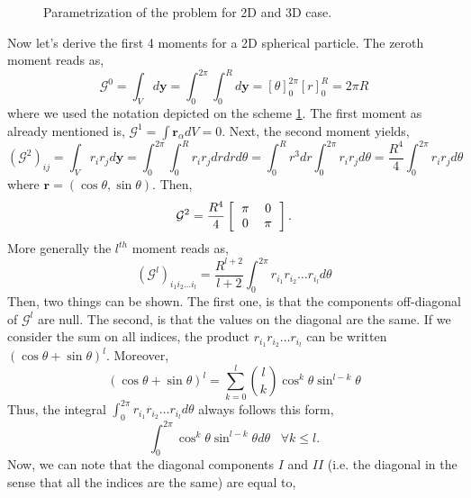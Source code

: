 {\begin{figure}[h!]
    \caption{Parametrization of the problem for 2D and 3D case.}
    \label{fig:schemeshpere}
\end{figure}
Now let's derive the first 4 moments for a 2D spherical particle. 
The zeroth moment reads as,
\begin{equation}
    \mathcal{G}^0 
    = \int_V  d\bm{y} 
    = \int_0^{2\pi}\int_0^{R}  d\bm{y} 
    = [\theta]_0^{2\pi}[r]_0^{R} 
    = 2\pi R
\end{equation}
where we used the notation depicted on the scheme \ref{fig:schemeshpere}.
The first moment as already mentioned is, $\mathcal{G}^1 = \int \bm{r}_\alpha dV = 0$.
Next, the second moment yields,
\begin{equation}
    (\mathcal{G}^2)_{ij}
    = \int_V r_ir_j d\bm{y} 
    = \int_0^{2\pi}\int_0^{R} r_ir_j d r dr d\theta 
    = \int_0^{R} r^3 dr \int_0^{2\pi} r_ir_j d\theta  
    = \frac{R^4}{4} \int_0^{2\pi} r_ir_j d\theta 
\end{equation}
where $\bm{r} = (\cos{\theta}, \sin{\theta})$. 
Then, 
\begin{equation}
    \mathcal{G}^2 = \frac{R^4}{4}\left[\begin{tabular}{cc}
        $\pi$&$0$\\
        $0$&$\pi$\\
    \end{tabular}
    \right].
\end{equation}
More generally the $l^{th}$ moment reads as, 
\begin{equation}
    (\mathcal{G}^l)_{i_1i_2\ldots i_l}
    = \frac{R^{l+2}}{l+2} \int_0^{2\pi} r_{i_1}r_{i_2}\ldots r_{i_l} d\theta 
\end{equation}
Then, two things can be shown. 
The first one, is that the components off-diagonal of $\mathcal{G}^l$ are null. 
The second, is that the values on the diagonal are the same. 
If we consider the sum on all indices, the product $r_{i_1}r_{i_2}\ldots r_{i_l}$ can be written $(\cos\theta+\sin\theta)^l$.
Moreover, 
\begin{equation}
    (\cos\theta+\sin\theta)^l  = \sum_{k=0}^l\binom{l}{k}\cos^k\theta\sin^{l-k}\theta
\end{equation}
Thus, the integral $\int_0^{2\pi} r_{i_1}r_{i_2}\ldots r_{i_l} d\theta$ always follows this form,
\begin{equation}
    \int_0^{2\pi} \cos^k\theta\sin^{l-k}\theta d\theta \;\;\;\forall k\leq l. 
    \label{eq:cossin}
\end{equation}
Now, we can note that the diagonal components $I$ and $II$ (i.e. the diagonal in the sense that all the indices are the same) are equal to,
}

